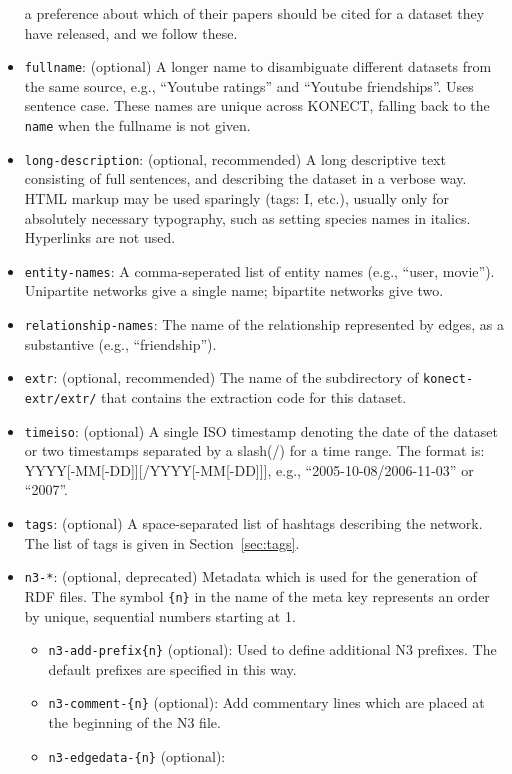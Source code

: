 \documentclass{article}
\begin{document}
\begin{itemize}
  a preference about which of their papers should be cited for a dataset
  they have released, and we follow these. 
\item \texttt{fullname}: (optional) A longer name to disambiguate
  different datasets from the same source, e.g., ``Youtube
  ratings'' and ``Youtube friendships''.  Uses sentence case.  These
  names are unique across KONECT, falling back to the \texttt{name} when
  the fullname is not given. 
\item \texttt{long-description}: (optional, recommended) A long descriptive
  text consisting of full sentences, and describing the dataset in
  a verbose way.  HTML markup may be used sparingly (tags: I,
  etc.), usually only for absolutely necessary typography, such as
  setting species names in italics.  Hyperlinks are not used. 
\item \texttt{entity-names}: A comma-seperated list of
  entity names (e.g., ``user, movie'').  Unipartite networks give
  a single name; bipartite networks give two.
\item \texttt{relationship-names}: The name of the
  relationship represented by edges, as a substantive (e.g.,
  ``friendship'').
\item \texttt{extr}: (optional, recommended) The name of the
  subdirectory of \texttt{konect-extr/extr/} that
  contains the extraction code for this dataset.
\item \texttt{timeiso}: (optional) A single ISO timestamp denoting
  the date of the dataset or two timestamps separated by a
  slash(/) for a time range. The format is:
  YYYY[-MM[-DD]][/YYYY[-MM[-DD]]], e.g., ``2005-10-08/2006-11-03''
  or ``2007''.
\item \texttt{tags}: (optional) A space-separated list of hashtags
  describing the network.  The list of tags is given in
  Section~\ref{sec:tags}.  
\item \texttt{n3-*}: (optional, deprecated) Metadata which is used for the
  generation of RDF files. The symbol \texttt{\{n\}} in the name
  of the meta key represents an order by unique, sequential
  numbers starting at 1.
  \begin{itemize}
  \item \texttt{n3-add-prefix\{n\}} (optional):
    Used to define additional N3 prefixes. The
    default prefixes are specified in this way.
  \item \texttt{n3-comment-\{n\}} (optional): Add
    commentary lines which are placed at the
    beginning of the N3 file.
  \item \texttt{n3-edgedata-\{n\}} (optional):

\end{itemize}
\end{itemize}
\end{document}
